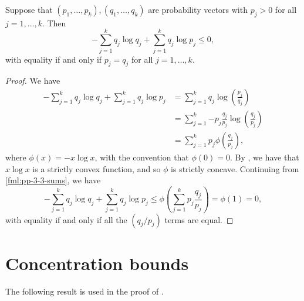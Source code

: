 \begin{lemma} \label{lem:pp-3-3}
	Suppose that $(p_1, \dots, p_k), (q_1, \dots, q_k)$ are probability vectors with $p_j > 0$ for all $j = 1, \dots, k$. Then
	\[
		-\sum_{j = 1}^k{q_j \log{q_j}} + \sum_{j = 1}^k{q_j \log{p_j}} \leq 0,
	\]
	with equality if and only if $p_j = q_j$ for all $j = 1, \dots, k$.
	\begin{proof}
		We have
		\begin{align}
			-\sum_{j = 1}^k{q_j \log{q_j}} + \sum_{j = 1}^k{q_j \log{p_j}} &= \sum_{j = 1}^k{q_j \log\left(\frac{p_j}{q_j}\right)} \nonumber \\
				&= \sum_{j = 1}^k{-p_j \frac{q_j}{p_j} \log\left(\frac{q_j}{p_j}\right)} \nonumber \\
				&= \sum_{j = 1}^k{p_j \phi\left(\frac{q_j}{p_j}\right)}, \label{fml:pp-3-3-sums}
		\end{align}
		where $\phi(x) = -x \log{x}$, with the convention that $\phi(0) = 0$. By , we have that $x \log{x}$ is a strictly convex function, and so $\phi$ is strictly concave. Continuing from \eqref{fml:pp-3-3-sums}, we have
		\[
			-\sum_{j = 1}^k{q_j \log{q_j}} + \sum_{j = 1}^k{q_j \log{p_j}} \leq \phi\left(\sum_{j = 1}^k{p_j \frac{q_j}{p_j}}\right) = \phi(1) = 0,
		\]
		with equality if and only if all the $(q_j / p_j)$ terms are equal.
	\end{proof}
\end{lemma}

\section{Concentration bounds}

The following result is used in the proof of .

